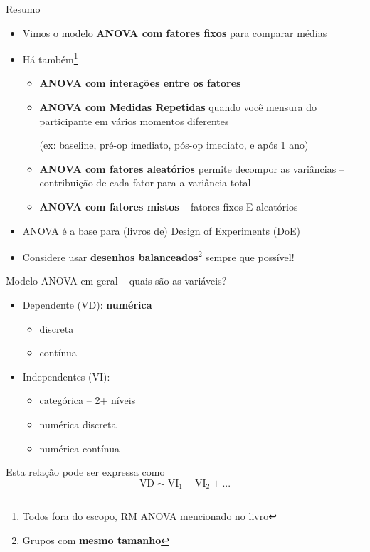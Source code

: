 \documentclass{beamer}
\begin{document}
\begin{frame}{Resumo}
  \begin{itemize}
    \footnotesize
  \item Vimos o modelo {\bf ANOVA com fatores fixos} para comparar médias
    \bigskip
  \item Há também\footnote{\scriptsize Todos fora do escopo, RM ANOVA mencionado no livro}
    \begin{itemize}
      \scriptsize
    \item {\bf ANOVA com interações entre os fatores}
    \item {\bf ANOVA com Medidas Repetidas} quando você mensura do participante em vários momentos diferentes

      (ex: baseline, pré-op imediato, pós-op imediato, e após 1 ano)
    \item {\bf ANOVA com fatores aleatórios} permite decompor as variâncias -- contribuição de cada fator para a variância total
    \item {\bf ANOVA com fatores mistos} -- fatores fixos E aleatórios
    \end{itemize}
    \bigskip
  \item ANOVA é a base para (livros de) Design of Experiments (DoE)
    \bigskip
  \item Considere usar {\bf desenhos balanceados}\footnote{Grupos com {\bf mesmo tamanho}} sempre que possível!
  \end{itemize}
\end{frame}

\begin{frame}{\small Modelo ANOVA em geral -- quais são as variáveis?}
    \begin{itemize}
    \small
  \item Dependente (VD): {\bf numérica}
    \begin{itemize}
      \footnotesize
    \item discreta
    \item contínua
    \end{itemize}
  \item Independentes (VI):
    \begin{itemize}
      \footnotesize
    \item categórica -- 2+ níveis
    \item numérica discreta
    \item numérica contínua
    \end{itemize}
  \end{itemize}
  \vfill
  \begin{block}{Esta relação pode ser expressa como}
    \begin{displaymath}
      \text{VD} \sim \text{VI}_1 + \text{VI}_2 +...
    \end{displaymath}
  \end{block}
\end{frame}
\end{document}
